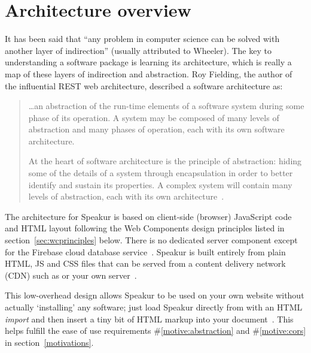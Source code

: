 \section{Architecture overview}
It has been said that ``any problem in computer science can be solved with another layer of indirection'' (usually attributed to Wheeler).
The key to understanding a software package is learning its architecture,
which is really a map of these layers of indirection and abstraction.
Roy Fielding, the author of the influential REST web architecture, described a software architecture as:

\begin{quote}
\dots an abstraction of the run-time elements of a software system during some phase of its operation. A system may be composed of many levels of abstraction and many phases of operation, each with its own software architecture.

At the heart of software architecture is the principle of abstraction: hiding some of the details of a system through encapsulation in order to better identify and sustain its properties. A complex system will contain many levels of abstraction, each with its own architecture~\cite{fielding2000}.
\end{quote}

The architecture for Speakur is based on client-side (browser) JavaScript code and HTML layout following the Web Components design principles listed in section~\ref{sec:wcprinciples} below. 
There is no dedicated server component except for the Firebase cloud database service~\cite{firebasecontributors2015}.
Speakur is built entirely from plain HTML, JS and CSS files that can be served from a content delivery network (CDN) 
such as  or your own server~\cite{landers2015-d}.

This low-overhead design allows Speakur to be used on your own website without actually `installing' any software;
just load Speakur directly from  with an HTML \textit{import}
and then insert a tiny bit of HTML markup into your document~\cite{landers2015-d}.
This helps fulfill the ease of use requirements 
\#\ref{motive:abstraction} and \#\ref{motive:cors}
in section~\ref{motivations}.

